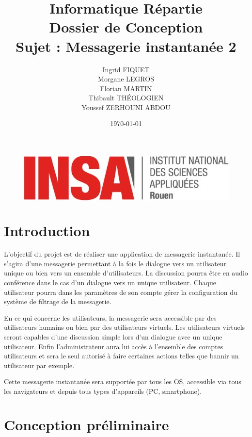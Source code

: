 \documentclass[a4paper,12pt]{article}
\title{Informatique Répartie\\Dossier de Conception\\Sujet : Messagerie instantanée 2}
\author{Ingrid FIQUET\\Morgane LEGROS\\Florian MARTIN\\Thibault THÉOLOGIEN\\Youssef ZERHOUNI ABDOU}
\date{\today}
\begin{document}
\begin{titlepage}
\vfill
	\begin{figure}
	\includegraphics[scale=0.3]{insarouen-logo.png}
	\end{figure}

\maketitle

\vfill
\noindent \hrulefill

\end{titlepage}



\newpage
\tableofcontents
\newpage

\section*{Introduction}

L’objectif du projet est de réaliser une application de messagerie instantanée. Il s’agira d’une messagerie permettant à la fois le dialogue vers un utilisateur unique ou bien vers un ensemble d’utilisateurs. La discussion pourra être en audio conférence dans le cas d’un dialogue vers un unique utilisateur. Chaque utilisateur pourra dans les paramètres de son compte gérer la configuration du système de filtrage de la messagerie. 

En ce qui concerne les utilisateurs, la messagerie sera accessible par des utilisateurs humains ou bien par des utilisateurs virtuels. Les utilisateurs virtuels seront capables d’une discussion simple lors d’un dialogue avec un unique utilisateur. Enfin l’administrateur aura lui accès à l’ensemble des comptes utilisateurs et sera le seul autorisé à faire certaines actions telles que bannir un utilisateur par exemple. 

Cette messagerie instantanée sera supportée par tous les OS, accessible via tous les navigateurs et depuis tous types d’appareils (PC, smartphone).


\newpage

\section{Conception préliminaire}
\end{document}
